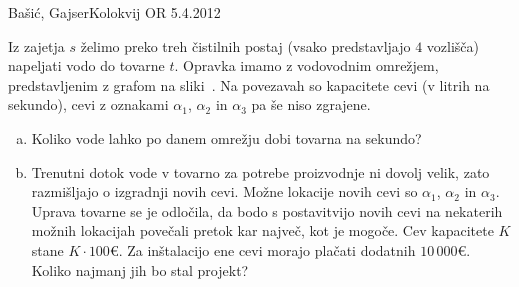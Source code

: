 \begin{naloga}{Bašić, Gajser}{Kolokvij OR 5.4.2012}
\begin{vprasanje}
Iz zajetja $s$ želimo preko treh čistilnih postaj
(vsako predstavljajo $4$ vozlišča)
napeljati vodo do tovarne $t$.
Opravka imamo z vodovodnim omrežjem,
pred\-stav\-lje\-nim z grafom na sliki~\fig.
Na povezavah so kapacitete cevi (v litrih na sekundo),
cevi z oznakami $\alpha_1$, $\alpha_2$ in $\alpha_3$ pa še niso zgrajene.

\begin{enumerate}[(a)]
\item Koliko vode lahko po danem omrežju dobi tovarna na sekundo?

\item Trenutni dotok vode v tovarno za potrebe proizvodnje ni dovolj velik,
zato razmišljajo o izgradnji novih cevi.
Možne lokacije novih cevi so $\alpha_1$, $\alpha_2$ in $\alpha_3$.
Uprava tovarne se je odločila,
da bodo s postavitvijo novih cevi na nekaterih možnih lokacijah
povečali pretok kar največ, kot je mogoče.
Cev kapacitete $K$ stane $K \cdot 100 €$.
Za inštalacijo ene cevi morajo plačati dodatnih $10\,000 €$.
Koliko najmanj jih bo stal projekt?
\end{enumerate}

\begin{slika}
\makebox[\textwidth][c]{
\pgfslika
}
\end{slika}
\end{vprasanje}
\begin{odgovor}
\end{odgovor}
\end{naloga}
